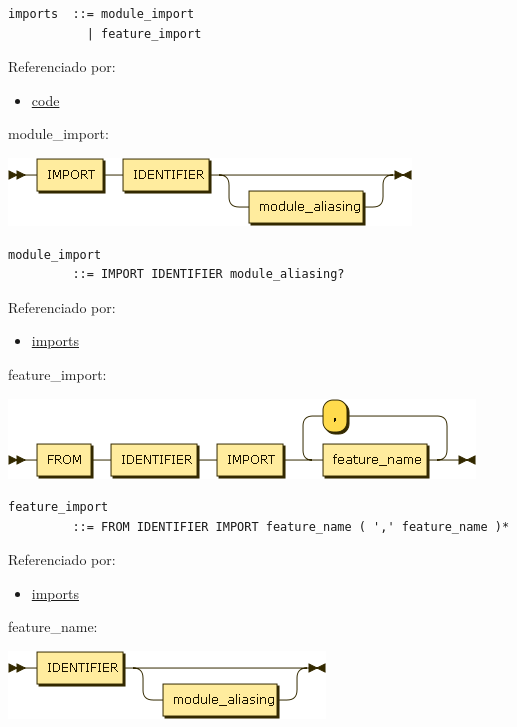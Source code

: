 \begin{verbatim}
imports  ::= module_import
           | feature_import
\end{verbatim}

Referenciado por:

\begin{itemize}
\tightlist
\item
  \protect\hyperlink{code}{code}
\end{itemize}

\protect\hypertarget{module_import}{}{module\_import:}

\includegraphics[width=4.20833in,height=0.70833in]{diagram/module_import.png}

\begin{verbatim}
module_import
         ::= IMPORT IDENTIFIER module_aliasing?
\end{verbatim}

Referenciado por:

\begin{itemize}
\tightlist
\item
  \protect\hyperlink{imports}{imports}
\end{itemize}

\protect\hypertarget{feature_import}{}{feature\_import:}

\includegraphics[width=4.87500in,height=0.83333in]{diagram/feature_import.png}

\begin{verbatim}
feature_import
         ::= FROM IDENTIFIER IMPORT feature_name ( ',' feature_name )*
\end{verbatim}

Referenciado por:

\begin{itemize}
\tightlist
\item
  \protect\hyperlink{imports}{imports}
\end{itemize}

\protect\hypertarget{feature_name}{}{feature\_name:}

\includegraphics[width=3.31250in,height=0.70833in]{diagram/feature_name.png}

